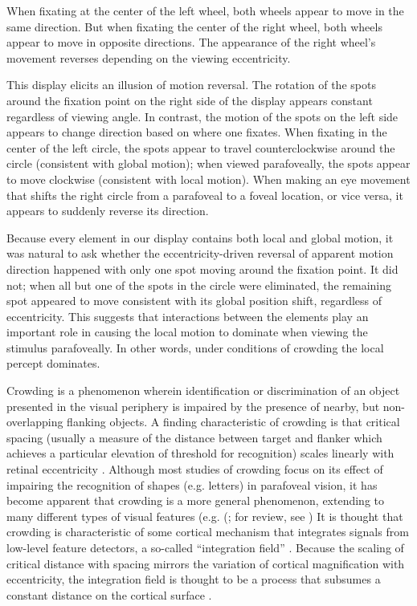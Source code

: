 \documentclass[manuscript]{subfiles}
\begin{document}
\begin{movie}
  \caption{When fixating at the center of the left wheel, both wheels appear to move in the same direction. But when fixating the center of the right wheel, both wheels appear to move in opposite directions. The appearance of the right wheel's movement reverses depending on the viewing eccentricity.}
  \label{mov:wheels}
\end{movie}

This display elicits an illusion of motion reversal. The rotation of the spots around the fixation point on the right side of the display appears constant regardless of viewing angle. In contrast, the motion of the spots on the left side appears to change direction based on where one fixates. When fixating in the center of the left circle, the spots appear to travel counterclockwise around the circle (consistent with global motion); when viewed parafoveally, the spots appear to move clockwise (consistent with local motion). When making an eye movement that shifts the right circle from a parafoveal to a foveal location, or vice versa, it appears to suddenly reverse its direction.

Because every element in our display contains both local and global motion, it was natural to ask whether the eccentricity-driven reversal of apparent motion direction happened with only one spot moving around the fixation point. It did not; when all but one of the spots in the circle were eliminated, the remaining spot appeared to move consistent with its global position shift, regardless of eccentricity. This suggests that interactions between the elements play an important role in causing the local motion to dominate when viewing the stimulus parafoveally. In other words, under conditions of crowding the local percept dominates. 

Crowding is a phenomenon wherein identification or discrimination of an object presented in the visual periphery is impaired by the presence of nearby, but non-overlapping flanking objects. A finding characteristic of crowding is that critical spacing (usually a measure of the distance between target and flanker which achieves a particular elevation of threshold for recognition) scales linearly with retinal eccentricity \citep{Bouma:1970ng,Toet:1992db}. Although most studies of crowding focus on its effect of impairing the recognition of shapes (e.g. letters) in parafoveal vision, it has become apparent that crowding is a more general phenomenon, extending to many different types of visual features (e.g. (\citealt{Berg:2007rc}; for review, see \citealt{Levi:2008la}) It is thought that crowding is characteristic of some cortical mechanism that integrates signals from low-level feature detectors, a so-called ``integration field'' \citep{Pelli:2004km}. Because the scaling of critical distance with spacing mirrors the variation of cortical magnification with eccentricity, the integration field is thought to be a process that subsumes a constant distance on the cortical surface \citep{Pelli:2008nx}.
\end{document}
